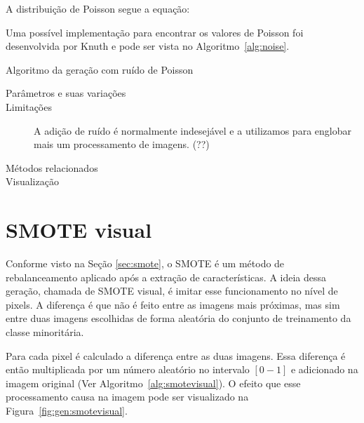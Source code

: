 
A distribuição de Poisson segue a equação:


Uma possível implementação para encontrar os valores de Poisson foi desenvolvida por Knuth e pode ser vista no Algoritmo~\ref{alg:noise}.

\vspace{0.5cm}
\begin{algorithm}[H]
  \caption{Algoritmo da geração com ruído de Poisson}
  \label{alg:noise}
  \SetAlgoLined
\end{algorithm}
\vspace{0.5cm}

\begin{description}
  \item[Parâmetros e suas variações]
  \item[Limitações] A adição de ruído é normalmente indesejável e a utilizamos
  para englobar mais um processamento de imagens. (??)
  \item[Métodos relacionados]
  \item[Visualização]
\end{description}
\section{SMOTE visual}

Conforme visto na Seção \ref{sec:smote}, o SMOTE é um método de rebalanceamento aplicado após a extração de características. A ideia dessa geração, chamada de SMOTE visual, é imitar esse funcionamento no nível de pixels. A diferença é que não é feito entre as imagens mais próximas, mas sim entre duas imagens escolhidas de forma aleatória do conjunto de treinamento da classe minoritária.

Para cada pixel é calculado a diferença entre as duas imagens. Essa diferença é então multiplicada por um número aleatório no intervalo $[0-1]$ e adicionado
na imagem original (Ver Algoritmo~\ref{alg:smotevisual}). O efeito que esse processamento causa na imagem pode ser visualizado na Figura~\ref{fig:gen:smotevisual}.

